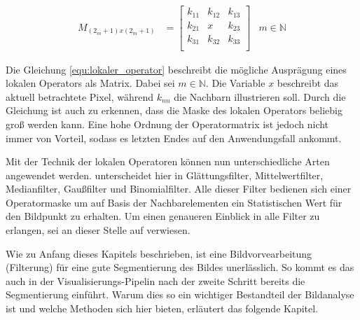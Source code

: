 \begin{align}
	\label{equ:lokaler_operator}M_{(2_m+1)x(2_m+1)} & = \begin{bmatrix}k_{11}&k_{12}&k_{13}\\ k_{21}&x&k_{23}\\ k_{31}&k_{32}&k_{33}\\\end{bmatrix} & m \in \mathbb{N}
\end{align}

Die Gleichung \ref{equ:lokaler_operator} beschreibt die mögliche Ausprägung
eines lokalen Operators als Matrix. Dabei sei $m \in \mathbb{N}$. Die Variable
$x$ beschreibt das aktuell betrachtete Pixel, während $k_{nn}$ die Nachbarn illustrieren
soll. Durch die Gleichung ist auch zu erkennen, dass die Maske des lokalen Operators
beliebig groß werden kann. Eine hohe Ordnung der Operatormatrix ist jedoch nicht
immer von Vorteil, sodass es letzten Endes auf den Anwendungsfall ankommt.

Mit der Technik der lokalen Operatoren können nun unterschiedliche Arten angewendet
werden. \citet[Seite 54 - 55]{handels2000} unterscheidet hier in Glättungsfilter,
Mittelwertfilter, Medianfilter, Gaußfilter und Binomialfilter. Alle dieser
Filter bedienen sich einer Operatormaske um auf Basis der Nachbarelementen ein
Statistischen Wert für den Bildpunkt zu erhalten. Um einen genaueren Einblick in
alle Filter zu erlangen, sei an dieser Stelle auf \citet[Seite 54 - 55]{handels2000}
verwiesen.

Wie zu Anfang dieses Kapitels beschrieben, ist eine Bildvorvearbeitung (Filterung)
für eine gute Segmentierung des Bildes unerlässlich. So kommt es das auch in der
Visualisierungs-Pipelin nach \citet[Seite 50]{handels2000} der zweite Schritt
bereits die Segmentierung einführt. Warum dies so ein wichtiger Bestandteil der Bildanalyse
ist und welche Methoden sich hier bieten, erläutert das folgende Kapitel.

\pagebreak

